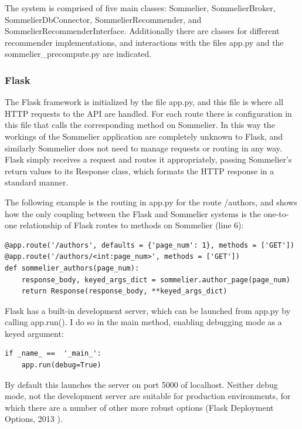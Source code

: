 The system is comprised of five main classes: Sommelier, SommelierBroker, SommelierDbConnector, SommelierRecommender, and SommelierRecommenderInterface. Additionally there are classes for different recommender implementations, and interactions with the files app.py and the sommelier\_precompute.py are indicated.

\subsubsection{Flask}

The Flask framework is initialized by the file app.py, and this file is where all HTTP requests to the API are handled. For each route there is configuration in this file that calls the corresponding method on Sommelier. In this way the workings of the Sommelier application are completely unknown to Flask, and similarly Sommelier does not need to manage requests or routing in any way. Flask simply receives a request and routes it appropriately, passing Sommelier's return values to its Response class, which formats the HTTP response in a standard manner.

The following example is the routing in app.py for the route /authors, and shows how the only coupling between the Flask and Sommelier systems is the one-to-one relationship of Flask routes to methods on Sommelier (line 6):

\footnotesize
\begin{verbatim}
@app.route('/authors', defaults = {'page_num': 1}, methods = ['GET'])
@app.route('/authors/<int:page_num>', methods = ['GET'])
def sommelier_authors(page_num):
    response_body, keyed_args_dict = sommelier.author_page(page_num)
    return Response(response_body, **keyed_args_dict)
\end{verbatim}
\normalsize

Flask has a built-in development server, which can be launched from app.py by calling app.run(). I do so in the main method, enabling debugging mode as a keyed argument:

\begin{verbatim}
if _name_ ==  '_main_':
    app.run(debug=True)
\end{verbatim}

By default this launches the server on port 5000 of localhost. Neither debug mode, not the development server are suitable for production environments, for which there are a number of other more robust options (Flask Deployment Options, 2013 \cite{FlaskDeployment}).

